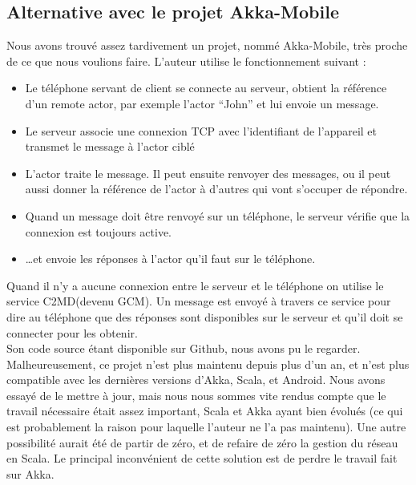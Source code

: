 \documentclass[a4paper,12pt]{article}
\begin{document}
\subsection{Alternative avec le projet Akka-Mobile}
Nous avons trouvé assez tardivement un projet, nommé Akka-Mobile, très proche
de ce que nous voulions faire. L’auteur utilise le fonctionnement suivant :\\
\begin{itemize}
\item Le téléphone servant de client se connecte au serveur, obtient la
  référence d’un remote actor, par exemple l’actor “John” et lui envoie un
  message.\\
\item Le serveur associe une connexion TCP avec l’identifiant de l’appareil et
  transmet le message à l’actor ciblé\\
\item L’actor traite le message. Il peut ensuite renvoyer des messages, ou il
  peut aussi donner la référence de l’actor à d’autres qui vont s’occuper de
  répondre.\\
\item Quand un message doit être renvoyé sur un téléphone, le serveur vérifie
  que la connexion est toujours active.\\
\item …et envoie les réponses à l’actor qu’il faut sur le téléphone.\\
\end{itemize}
Quand il n’y a aucune connexion entre le serveur et le téléphone on utilise le
service C2MD(devenu GCM). Un message est envoyé à travers ce service pour dire
au téléphone que des réponses sont disponibles sur le serveur et qu’il doit se
connecter pour les obtenir.\\

Son code source étant disponible sur Github, nous avons pu le
regarder. Malheureusement, ce projet n’est plus maintenu depuis plus d’un an,
et n’est plus compatible avec les dernières versions d’Akka, Scala, et
Android. Nous avons essayé de le mettre à jour, mais nous nous sommes vite
rendus compte que le travail nécessaire était assez important, Scala et Akka
ayant bien évolués (ce qui est probablement la raison pour laquelle l’auteur ne
l’a pas maintenu).  Une autre possibilité aurait été de partir de zéro, et de
refaire de zéro la gestion du réseau en Scala. Le principal inconvénient de
cette solution est de perdre le travail fait sur Akka.

\newpage
\end{document}
